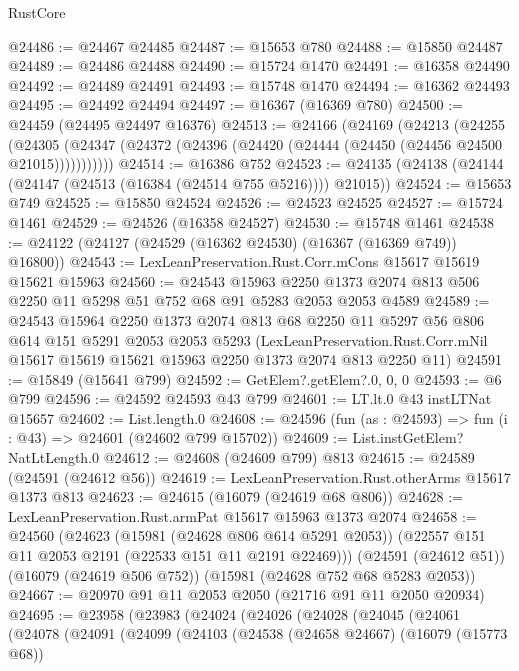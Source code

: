 \begin{lexlean}{RustCore}
\begin{coremodule}
@24486 := @24467 @24485
@24487 := @15653 @780
@24488 := @15850 @24487
@24489 := @24486 @24488
@24490 := @15724 @1470
@24491 := @16358 @24490
@24492 := @24489 @24491
@24493 := @15748 @1470
@24494 := @16362 @24493
@24495 := @24492 @24494
@24497 := @16367 (@16369 @780)
@24500 := @24459 (@24495 @24497 @16376)
@24513 := @24166
    (@24169
      (@24213
        (@24255
          (@24305 (@24347 (@24372 (@24396 (@24420 (@24444 (@24450 (@24456 @24500 @21015)))))))))))
@24514 := @16386 @752
@24523 := @24135 (@24138 (@24144 (@24147 (@24513 (@16384 (@24514 @755 @5216)))) @21015))
@24524 := @15653 @749
@24525 := @15850 @24524
@24526 := @24523 @24525
@24527 := @15724 @1461
@24529 := @24526 (@16358 @24527)
@24530 := @15748 @1461
@24538 := @24122 (@24127 (@24529 (@16362 @24530) (@16367 (@16369 @749)) @16800))
@24543 := LexLeanPreservation.Rust.Corr.mCons @15617 @15619 @15621 @15963
@24560 := @24543
    @15963
    @2250
    @1373
    @2074
    @813
    @506
    @2250
    @11
    @5298
    @51
    @752
    @68
    @91
    @5283
    @2053
    @2053
    @4589
@24589 := @24543
    @15964
    @2250
    @1373
    @2074
    @813
    @68
    @2250
    @11
    @5297
    @56
    @806
    @614
    @151
    @5291
    @2053
    @2053
    @5293
    (LexLeanPreservation.Rust.Corr.mNil
      @15617
      @15619
      @15621
      @15963
      @2250
      @1373
      @2074
      @813
      @2250
      @11)
@24591 := @15849 (@15641 @799)
@24592 := GetElem?.getElem?.{0, 0, 0}
@24593 := @6 @799
@24596 := @24592 @24593 @43 @799
@24601 := LT.lt.{0} @43 instLTNat @15657
@24602 := List.length.{0}
@24608 := @24596 (fun (as : @24593) => fun (i : @43) => @24601 (@24602 @799 @15702))
@24609 := List.instGetElem?NatLtLength.{0}
@24612 := @24608 (@24609 @799) @813
@24615 := @24589 (@24591 (@24612 @56))
@24619 := LexLeanPreservation.Rust.otherArms @15617 @1373 @813
@24623 := @24615 (@16079 (@24619 @68 @806))
@24628 := LexLeanPreservation.Rust.armPat @15617 @15963 @1373 @2074
@24658 := @24560
    (@24623
      (@15981 (@24628 @806 @614 @5291 @2053))
      (@22557 @151 @11 @2053 @2191 (@22533 @151 @11 @2191 @22469)))
    (@24591 (@24612 @51))
    (@16079 (@24619 @506 @752))
    (@15981 (@24628 @752 @68 @5283 @2053))
@24667 := @20970 @91 @11 @2053 @2050 (@21716 @91 @11 @2050 @20934)
@24695 := @23958
    (@23983
      (@24024
        (@24026
          (@24028
            (@24045
              (@24061
                (@24078
                  (@24091
                    (@24099
                      (@24103
                        (@24538
                          (@24658 @24667)
                          (@16079 (@15773 @68))

\end{coremodule}
\end{lexlean}
